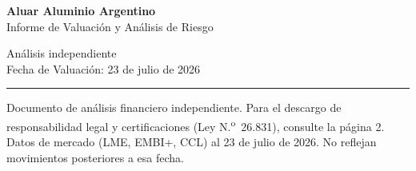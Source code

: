 \documentclass[11pt,a4paper]{article}
\begin{document}
\renewcommand{\topfraction}{0.95}
\renewcommand{\bottomfraction}{0.95}
\renewcommand{\floatpagefraction}{0.85}
\renewcommand{\textfraction}{0.05}


\noindent
\begin{minipage}[b]{0.65\textwidth}
    {\fontsize{22}{26}\selectfont \color{gsnavy} \textbf{Aluar Aluminio Argentino}} \\[0.15cm]
    {\large \color{gsgray} \textsf{Informe de Valuación y Análisis de Riesgo}}
\end{minipage}%
\begin{minipage}[b]{0.35\textwidth}
    \raggedleft
    {\small \color{gsgray} Análisis independiente} \\
    {\small \color{gsgray} Fecha de Valuación: 23 de julio de 2026}
\end{minipage}

\vspace{0.15cm}
\noindent\textcolor{gsnavy}{\rule{\textwidth}{1.2pt}}
\vspace{0.08cm}

\noindent
{\scriptsize \color{gsgray} Documento de análisis financiero independiente. Para el descargo de responsabilidad legal y certificaciones (Ley N.\textsuperscript{o}~26.831), consulte la página 2. Datos de mercado (LME, EMBI+, CCL) al 23 de julio de 2026. No reflejan movimientos posteriores a esa fecha.}

\vspace{0.15cm}
\end{document}
